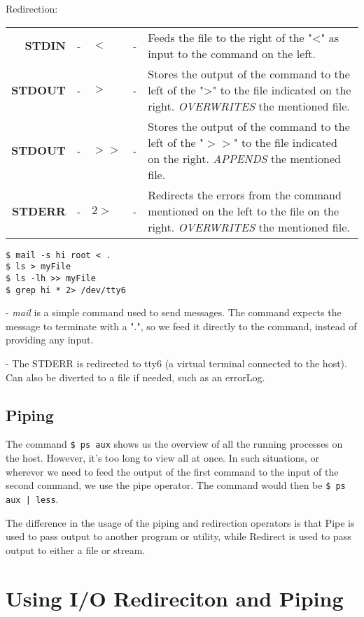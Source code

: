 \noindent
Redirection:

\noindent
\begin{tabular}{rclcp{}}
	\textbf{STDIN} &- &$<$ &- &Feeds the file to the right of the "<" as input to the command on the left. \\
	\textbf{STDOUT} &- &$>$ &- &Stores the output of the command to the left of the ">" to the file indicated on the right. \textit{OVERWRITES} the mentioned file.\\
	\textbf{STDOUT} &- &$>>$ &- &Stores the output of the command to the left of the "$>>$" to the file indicated on the right. \textit{APPENDS} the mentioned file.\\
	\textbf{STDERR} &- &$2>$ &- &Redirects the errors from the command mentioned on the left to the file on the right. \textit{OVERWRITES} the mentioned file.\\
\end{tabular}
	
\noindent
\begin{verbatim}	
$ mail -s hi root < .
$ ls > myFile
$ ls -lh >> myFile
$ grep hi * 2> /dev/tty6
\end{verbatim}

 - \textit{mail} is a simple command used to send messages. The command expects the message to terminate with a ".", so we feed it directly to the command, instead of providing any input.

 - The STDERR is redirected to tty6 (a virtual terminal connected to the host). Can also be diverted to a file if needed, such as an errorLog.

\subsection{Piping}
The command \verb|$ ps aux| shows us the overview of all the running processes on the host. However, it's too long to view all at once. In such situations, or wherever we need to feed the output of the first command to the input of the second command, we use the pipe operator. The command would then be \verb=$ ps aux | less=.

The difference in the usage of the piping and redirection operators is that Pipe is used to pass output to another program or utility, while Redirect is used to pass output to either a file or stream.

\section{Using I/O Redireciton and Piping}

